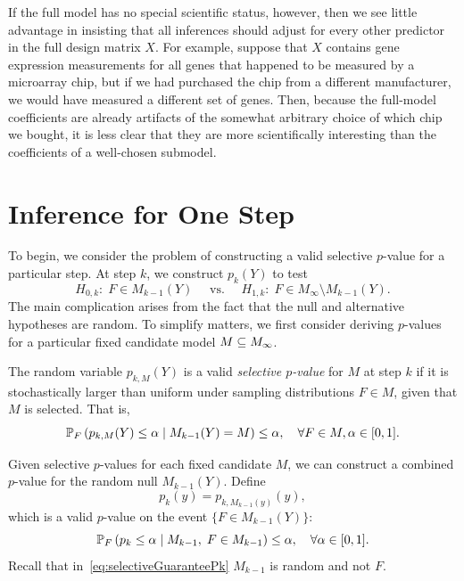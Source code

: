 \documentclass{article}
\begin{document}
If the full model has no special scientific status, however, then we see little advantage in insisting that all inferences should adjust for every other predictor in the full design matrix $X$. For example, suppose that $X$ contains gene expression measurements for all genes that happened to be measured by a microarray chip, but if we had purchased the chip from a different manufacturer, we would have measured a different set of genes. Then, because the full-model coefficients are already artifacts of the somewhat arbitrary choice of which chip we bought, it is less clear that they are more scientifically interesting than the coefficients of a well-chosen submodel.



\section{Inference for One Step}

To begin, we consider the problem of constructing a valid selective $p$-value for a particular step. At step $k$, we construct $p_k(Y)$ to test
\[
  H_{0,k}:\; F \in M_{k-1}(Y)
  \quad \text{ vs. } \quad
  H_{1,k}:\; F \in M_\infty \setminus M_{k-1}(Y).
\]
The main complication arises from the fact that the null and alternative hypotheses are random. To simplify matters, we first consider deriving $p$-values for a particular fixed candidate model $M\sub M_{\infty}$.

The random variable  $p_{k,M}(Y)$ is a valid {\em selective $p$-value} for $M$ at step $k$ if it is stochastically larger than uniform under sampling distributions $F\in M$, given that $M$ is selected. That is,
\[
\P_F\left(p_{k,M}(Y) \leq \alpha \mid M_{k-1}(Y) = M\right) 
\leq \alpha, \quad \forall F\in M, \alpha \in [0,1].
\]

Given selective $p$-values for each fixed candidate $M$, we can construct a combined $p$-value for the random null $M_{k-1}(Y)$. Define
\[
p_k(y) = p_{k, M_{k-1}(y)}(y),
\]
which is a valid $p$-value on the event $\{F \in M_{k-1}(Y)\}$:
\begin{equation}\label{eq:selectiveGuaranteePk}
\P_F\left(p_k \leq \alpha \mid M_{k-1}, 
  \;F\in M_{k-1}\right) \leq \alpha, \quad \forall \alpha \in [0,1].
\end{equation}
Recall that in~\eqref{eq:selectiveGuaranteePk} $M_{k-1}$ is random and not $F$.
\end{document}
